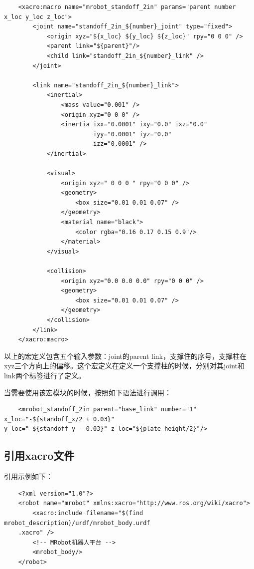 \documentclass[9pt, oneside]{book}
\begin{document}
\begin{verbatim}
    <xacro:macro name="mrobot_standoff_2in" params="parent number x_loc y_loc z_loc">
        <joint name="standoff_2in_${number}_joint" type="fixed">
            <origin xyz="${x_loc} ${y_loc} ${z_loc}" rpy="0 0 0" />
            <parent link="${parent}"/>
            <child link="standoff_2in_${number}_link" />
        </joint>

        <link name="standoff_2in_${number}_link">
            <inertial>
                <mass value="0.001" />
                <origin xyz="0 0 0" />
                <inertia ixx="0.0001" ixy="0.0" ixz="0.0"
                         iyy="0.0001" iyz="0.0"
                         izz="0.0001" />
            </inertial>

            <visual>
                <origin xyz=" 0 0 0 " rpy="0 0 0" />
                <geometry>
                    <box size="0.01 0.01 0.07" />
                </geometry>
                <material name="black">
                    <color rgba="0.16 0.17 0.15 0.9"/>
                </material>
            </visual>

            <collision>
                <origin xyz="0.0 0.0 0.0" rpy="0 0 0" />
                <geometry>
                    <box size="0.01 0.01 0.07" />
                </geometry>
            </collision>
        </link>
    </xacro:macro>
\end{verbatim}

以上的宏定义包含五个输入参数：joint的parent link，支撑住的序号，支撑柱在xyz三个方向上的偏移。这个宏定义在定义一个支撑柱的时候，分别对其joint和link两个标签进行了定义。

当需要使用该宏模块的时候，按照如下语法进行调用：

\begin{verbatim}
    <mrobot_standoff_2in parent="base_link" number="1" x_loc="-${standoff_x/2 + 0.03}" 
y_loc="-${standoff_y - 0.03}" z_loc="${plate_height/2}"/>
\end{verbatim}


\subsection{引用xacro文件}

引用示例如下：

\begin{verbatim}
    <?xml version="1.0"?>
    <robot name="mrobot" xmlns:xacro="http://www.ros.org/wiki/xacro">
        <xacro:include filename="$(find mrobot_description)/urdf/mrobot_body.urdf
    .xacro" />
        <!-- MRobot机器人平台 -->
        <mrobot_body/>
    </robot>
\end{verbatim}
\end{document}
